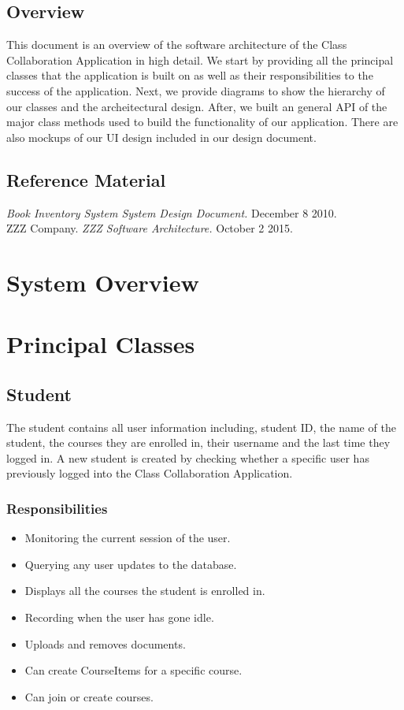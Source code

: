 \documentclass{scrreprt}
\begin{document}
\section{Overview}
This document is an overview of the software architecture of the Class Collaboration Application in high detail. We start by providing all the principal classes that the application is built on as well as their responsibilities to the success of the application. Next, we provide diagrams to show the hierarchy of our classes and the archeitectural design. After, we built an general API of the major class methods used to build the functionality of our application. There are also mockups of our UI design included in our design document. 

\section{Reference Material}
\textit{Book Inventory System System Design Document.} December 8 2010. \\
ZZZ Company. \textit{ZZZ Software Architecture.} October 2 2015. 



\chapter{System Overview}


\chapter{Principal Classes}
	
\section{Student}
The student contains all user information including, student ID, the name of the student, the courses they are enrolled in, their username and the last time they logged in. A new student is created by checking whether a specific user has previously logged into the Class Collaboration Application.
\subsection{Responsibilities}
\begin{itemize}
	\item Monitoring the current session of the user.
	\item Querying any user updates to the database. 
	\item Displays all the courses the student is enrolled in. 
	\item Recording when the user has gone idle. 
	\item Uploads and removes documents.
	\item Can create CourseItems for a specific course.
	\item Can join or create courses.
\end{itemize}
\end{document}
